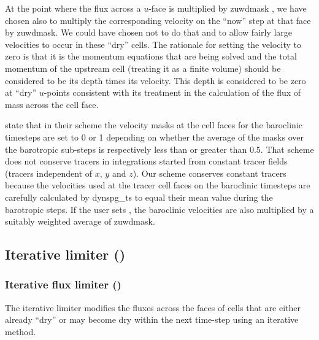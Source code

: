 \documentclass[../main/NEMO_manual]{subfiles}
\begin{document}
At the point where the flux across a $u$-face is multiplied by zuwdmask , we have chosen
also to multiply the corresponding velocity on the ``now'' step at that face by zuwdmask. We could have
chosen not to do that and to allow fairly large velocities to occur in these ``dry'' cells.
The rationale for setting the velocity to zero is that it is the momentum equations that are being solved
and the total momentum of the upstream cell (treating it as a finite volume) should be considered
to be its depth times its velocity. This depth is considered to be zero at ``dry'' $u$-points consistent with its
treatment in the calculation of the flux of mass across the cell face.

\cite{warner.defne.ea_CG13} state that in their scheme the velocity masks at the cell faces for the baroclinic
timesteps are set to 0 or 1 depending on whether the average of the masks over the barotropic sub-steps is respectively less than
or greater than 0.5. That scheme does not conserve tracers in integrations started from constant tracer
fields (tracers independent of $x$, $y$ and $z$). Our scheme conserves constant tracers because
the velocities used at the tracer cell faces on the baroclinic timesteps are carefully calculated by dynspg\_ts
to equal their mean value during the barotropic steps. If the user sets , the
baroclinic velocities are also multiplied by a suitably weighted average of zuwdmask.


\subsection[Iterative limiter (\textit{wet\_dry.F90})]{Iterative limiter ()}
\label{subsec:DYN_wd_iterative_limiter}

\subsubsection[Iterative flux limiter (\textit{wet\_dry.F90})]{Iterative flux limiter ()}
\label{subsec:DYN_wd_il_spg_limiter}

The iterative limiter modifies the fluxes across the faces of cells that are either already ``dry''
or may become dry within the next time-step using an iterative method.
\end{document}
